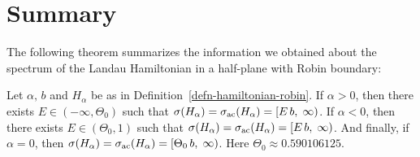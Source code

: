 \bigskip

\section{Summary}
The following theorem summarizes the information we obtained about the spectrum of the Landau Hamiltonian in a half-plane with Robin boundary:
\begin{thm}
    Let $\alpha, \, b$ and $H_\alpha$ be as in Definition~\ref{defn-hamiltonian-robin}. If $\alpha > 0$, then there exists $E \in (-\infty, \Theta_0)$ such that $ \sigma(H_\alpha) = \sigma_{\mathrm{ac}}(H_\alpha) = [E \, b, \; \infty )$.
    If $\alpha < 0$, then there exists $E \in (\Theta_0, 1)$ such that $\sigma(H_\alpha) = \sigma_{\mathrm{ac}}(H_\alpha) = [E \, b, \; \infty )$.
    And finally, if $\alpha = 0$, then $\sigma(H_\alpha) = \sigma_{\mathrm{ac}}(H_\alpha) = [\Theta_0 \, b, \; \infty )$. Here $\Theta_0 \approx 0.590106125$.
\end{thm}


